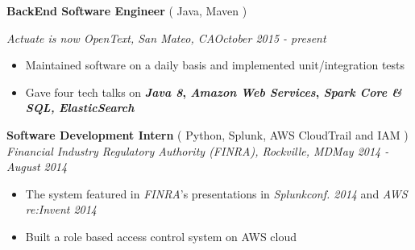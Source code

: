 \documentclass[3pt]{article}
\newenvironment{changemargin}[2]{%
  \begin{list}{}{%
    \setlength{\topsep}{0pt}%
    \setlength{\leftmargin}{#1}%
    \setlength{\rightmargin}{#2}%
    \setlength{\listparindent}{\parindent}%
    \setlength{\itemindent}{\parindent}%
    \setlength{\parsep}{\parskip}%
  }%
  \item[]}{\end{list}
}
\newenvironment{body} {
	\vspace*{-16pt}
	\begin{changemargin}{-0.25in}{-0.5in}
  }	
	{\end{changemargin}
}
\begin{document}
\begin{body}
	\vspace{17pt}
	
    \textbf{BackEnd Software Engineer} ( Java, Maven )\\
   \vspace{1pt}

    \emph{Actuate is now OpenText, San Mateo, CA}\hfill \emph{October 2015 - present}\\
     \begin{itemize} \itemsep -0.5pt
    \item{Maintained software on a daily basis and implemented unit/integration tests}
     \item {Gave four tech talks on\textbf{ \emph{Java 8}, \emph{Amazon Web Services}, \emph{Spark Core \& SQL,} \emph{ElasticSearch} } } 
   
    \end{itemize}
	
   \vspace{5pt}

    \textbf{Software Development Intern} ( Python, Splunk, AWS CloudTrail and IAM )\\

    \emph{Financial Industry Regulatory Authority (FINRA), Rockville, MD}\hfill \emph{May 2014 - August 2014}\\
     \begin{itemize} \itemsep -0.5pt
    \item{The system featured in \emph{FINRA}'s presentations in \emph{Splunkconf. 2014} and \emph{AWS re:Invent 2014}}
     \item {Built a role based access control system on AWS cloud}
   

\end{itemize}
\end{body}
\end{document}
